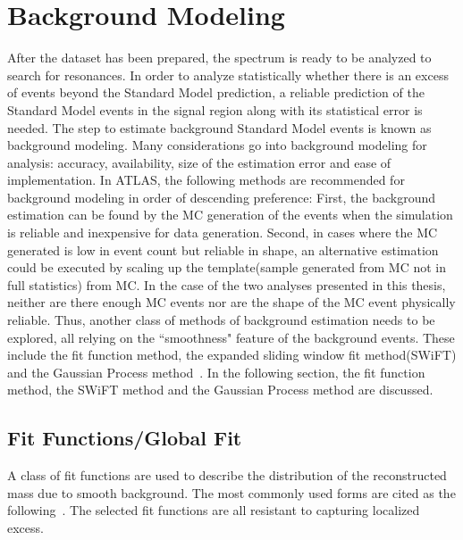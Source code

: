 \section{Background Modeling}
\label{sec:backgroundest}
After the dataset has been prepared, the spectrum is ready to be analyzed to search for resonances. In order to analyze statistically whether there is an excess of events beyond the Standard Model prediction, a reliable prediction of the Standard Model events in the signal region along with its statistical error is needed. The step to estimate background Standard Model events is known as background modeling.
Many considerations go into background modeling for analysis: accuracy, availability, size of the estimation error and ease of implementation. In ATLAS, the following methods are recommended for background modeling in order of descending preference:
    First, the background estimation can be found by the MC generation of the events when the simulation is reliable and inexpensive for data generation. Second, in cases where the MC generated is low in event count but reliable in shape, an alternative estimation could be executed by scaling up the template(sample generated from MC not in full statistics) from MC. In the case of the two analyses presented in this thesis, neither are there enough MC events nor are the shape of the MC event physically reliable. Thus, another class of methods of background estimation needs to be explored, all relying on the ``smoothness" feature of the background events. These include the fit function method, the expanded sliding window fit method(SWiFT) and the Gaussian Process method~\cite{frate2017modeling}.
    In the following section, the fit function method, the SWiFT method and the Gaussian Process method are discussed.

\subsection{Fit Functions/Global Fit}
\label{sec:fitfunction}
A class of fit functions are used to describe the distribution of the reconstructed mass due to smooth background. The most commonly used forms are cited as the following~\cite{ATL-PHYS-PUB-2020-028}. The selected fit functions are all resistant to capturing localized excess.

